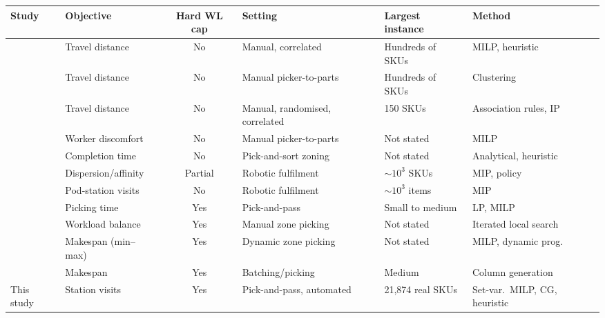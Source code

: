 \documentclass[]{interact}
\begin{document}
\begin{table}[H]
\centering
{}
{\footnotesize\setlength{\tabcolsep}{3pt}
\begin{tabularx}{\textwidth}{@{}l X c X X >{\raggedright\arraybackslash}p{2.8cm}@{}}
\toprule
Study & Objective & Hard WL cap & Setting & Largest instance & Method \\
\midrule
\citet{zhang2019cie}        & Travel distance       & No    & Manual, correlated      & Hundreds of SKUs & MILP, heuristic \\
\citet{wang2020}            & Travel distance       & No    & Manual picker-to-parts  & Hundreds of SKUs & Clustering \\
\citet{pang2017datamining}  & Travel distance       & No    & Manual, randomised, correlated & 150 SKUs & Association rules, IP \\
\citet{larco2017discomfort} & Worker discomfort     & No    & Manual picker-to-parts  & Not stated & MILP \\
\citet{dekoster2012zones}   & Completion time       & No    & Pick-and-sort zoning    & Not stated & Analytical, heuristic \\
\citet{mirzaei2021}         & Dispersion/affinity   & Partial & Robotic fulfilment   & $\sim 10^3$ SKUs & MIP, policy \\
\citet{xie2021}             & Pod-station visits    & No    & Robotic fulfilment      & $\sim 10^3$ items & MIP \\
\citet{tarczynski2023}      & Picking time          & Yes   & Pick-and-pass           & Small to medium & LP, MILP \\
\citet{vanheusden2022workload} & Workload balance    & Yes   & Manual zone picking   & Not stated & Iterated local search \\
\citet{saylam2023minmax}    & Makespan (min--max)   & Yes   & Dynamic zone picking    & Not stated & MILP, dynamic prog. \\
\citet{muter2022}           & Makespan              & Yes   & Batching/picking        & Medium & Column generation \\
This study                  & Station visits        & Yes   & Pick-and-pass, automated & 21,874 real SKUs & Set-var.\ MILP, CG, heuristic \\
\bottomrule
\end{tabularx}}
\label{tab:litreview}
\end{table}
\end{document}
